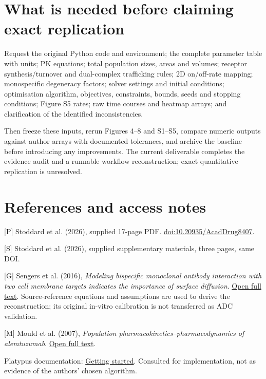 \documentclass[11pt,a4paper]{article}
\begin{document}
\section{What is needed before claiming exact replication}
Request the original Python code and environment; the complete parameter table with units; PK equations; total population sizes, areas and volumes; receptor synthesis/turnover and dual-complex trafficking rules; 2D on/off-rate mapping; monospecific degeneracy factors; solver settings and initial conditions; optimisation algorithm, objectives, constraints, bounds, seeds and stopping conditions; Figure S5 rates; raw time courses and heatmap arrays; and clarification of the identified inconsistencies.

Then freeze these inputs, rerun Figures 4--8 and S1--S5, compare numeric outputs against author arrays with documented tolerances, and archive the baseline before introducing any improvements. The current deliverable completes the evidence audit and a runnable workflow reconstruction; exact quantitative replication is unresolved.

\section*{References and access notes}
[P] Stoddard et al. (2026), supplied 17-page PDF. \href{https://doi.org/10.20935/AcadDrug8407}{doi:10.20935/AcadDrug8407}.

[S] Stoddard et al. (2026), supplied supplementary materials, three pages, same DOI.

[G] Sengers et al. (2016), \emph{Modeling bispecific monoclonal antibody interaction with two cell membrane targets indicates the importance of surface diffusion}. \href{https://pmc.ncbi.nlm.nih.gov/articles/PMC4968105/}{Open full text}. Source-reference equations and assumptions are used to derive the reconstruction; its original in-vitro calibration is not transferred as ADC validation.

[M] Mould et al. (2007), \emph{Population pharmacokinetics--pharmacodynamics of alemtuzumab}. \href{https://pmc.ncbi.nlm.nih.gov/articles/PMC2000651/}{Open full text}.

Platypus documentation: \href{https://platypus.readthedocs.io/en/latest/getting-started.html}{Getting started}. Consulted for implementation, not as evidence of the authors' chosen algorithm.
\end{document}
